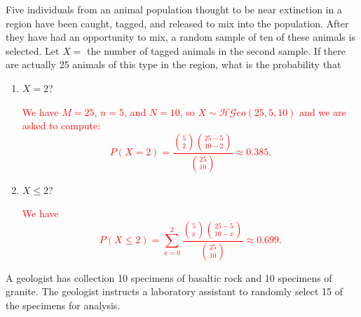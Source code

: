 \documentclass[12pt,reqno]{amsart}
\begin{document}
\prob Five individuals from an animal population thought to be near extinction in a region have been caught, tagged, and released to mix into the population. After they have had an opportunity to mix, a random sample of ten of these animals is selected. Let $X =$ the number of tagged animals in the second sample. If there are actually 25 animals of this type in the region, what is the probability that

\medskip
\begin{enumerate}
\item $X = 2$?

\bigskip
\textcolor{red}{We have $M=25$, $n=5$, and $N=10$, so $X\sim \mathcal{HG}eo(25, 5, 10)$ and we are asked to compute:
	\[P(X=2) = \frac{\binom{5}{2} \binom{25 - 5}{10-2}}{\binom{25}{10}} \approx 0.385.
	\]}
\bigskip

\item $X\leq2$?

\bigskip
\textcolor{red}{We have
	\[P(X\leq 2) = \sum_{x=0}^2 \frac{\binom{5}{x}\binom{25-5}{10-x}}{\binom{25}{10}} \approx 0.699.
	\]}
\end{enumerate}









\bigskip
\prob A geologist has collection 10 specimens of basaltic rock and 10 specimens of granite. The geologist instructs a laboratory assistant to randomly select 15 of the specimens for analysis.
\end{document}
